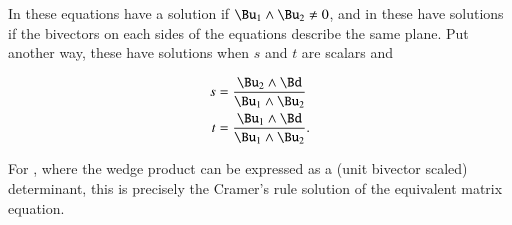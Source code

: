 In  these equations have a solution if \( \Bu_1 \wedge \Bu_2 \ne 0 \), and in  these have solutions if the bivectors on each sides of the equations describe the same plane.
Put another way, these have solutions when \( s \) and \( t \) are scalars and

\begin{dmath}\label{eqn:SimpleProducts2:1100}
\begin{aligned}
s &= \frac{\Bu_2 \wedge \Bd}{\Bu_1 \wedge \Bu_2} \\
t &= \frac{\Bu_1 \wedge \Bd}{\Bu_1 \wedge \Bu_2}.
\end{aligned}
\end{dmath}

For ,
where the wedge product can be expressed as a (unit bivector scaled) determinant, this is precisely the Cramer's rule solution of the equivalent matrix equation.
